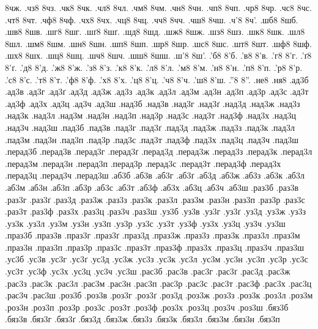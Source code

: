 {8чж.
.чз8
8чз.
.чк8
8чк.
.чл8
8чл.
.чм8
8чм.
.чн8
8чн.
.чп8
8чп.
.чр8
8чр.
.чс8
8чс.
.чт8
8чт.
.чф8
8чф.
.чх8
8чх.
.чц8
8чц.
.чч8
8чч.
.чш8
8чш.
.ч'8
8ч'.
.шб8
8шб.
.шв8
8шв.
.шг8
8шг.
.шґ8
8шґ.
.шд8
8шд.
.шж8
8шж.
.шз8
8шз.
.шк8
8шк.
.шл8
8шл.
.шм8
8шм.
.шн8
8шн.
.шп8
8шп.
.шр8
8шр.
.шс8
8шс.
.шт8
8шт.
.шф8
8шф.
.шх8
8шх.
.шц8
8шц.
.шч8
8шч.
.шш8
8шш.
.ш'8
8ш'.
.'б8
8'б.
.'в8
8'в.
.'г8
8'г.
.'ґ8
8'ґ.
.'д8
8'д.
.'ж8
8'ж.
.'з8
8'з.
.'к8
8'к.
.'л8
8'л.
.'м8
8'м.
.'н8
8'н.
.'п8
8'п.
.'р8
8'р.
.'с8
8'с.
.'т8
8'т.
.'ф8
8'ф.
.'х8
8'х.
.'ц8
8'ц.
.'ч8
8'ч.
.'ш8
8'ш.
.''8
8''.
.не8
.ня8
.ад3б
.ад3в
.ад3г
.ад3ґ
.ад3д
.ад3ж
.ад3з
.ад3к
.ад3л
.ад3м
.ад3н
.ад3п
.ад3р
.ад3с
.ад3т
.ад3ф
.ад3х
.ад3ц
.ад3ч
.ад3ш
.над3б
.над3в
.над3г
.над3ґ
.над3д
.над3ж
.над3з
.над3к
.над3л
.над3м
.над3н
.над3п
.над3р
.над3с
.над3т
.над3ф
.над3х
.над3ц
.над3ч
.над3ш
.пад3б
.пад3в
.пад3г
.пад3ґ
.пад3д
.пад3ж
.пад3з
.пад3к
.пад3л
.пад3м
.пад3н
.пад3п
.пад3р
.пад3с
.пад3т
.пад3ф
.пад3х
.пад3ц
.пад3ч
.пад3ш
.перад3б
.перад3в
.перад3г
.перад3ґ
.перад3д
.перад3ж
.перад3з
.перад3к
.перад3л
.перад3м
.перад3н
.перад3п
.перад3р
.перад3с
.перад3т
.перад3ф
.перад3х
.перад3ц
.перад3ч
.перад3ш
.аб3б
.аб3в
.аб3г
.аб3ґ
.аб3д
.аб3ж
.аб3з
.аб3к
.аб3л
.аб3м
.аб3н
.аб3п
.аб3р
.аб3с
.аб3т
.аб3ф
.аб3х
.аб3ц
.аб3ч
.аб3ш
.раз3б
.раз3в
.раз3г
.раз3ґ
.раз3д
.раз3ж
.раз3з
.раз3к
.раз3л
.раз3м
.раз3н
.раз3п
.раз3р
.раз3с
.раз3т
.раз3ф
.раз3х
.раз3ц
.раз3ч
.раз3ш
.уз3б
.уз3в
.уз3г
.уз3ґ
.уз3д
.уз3ж
.уз3з
.уз3к
.уз3л
.уз3м
.уз3н
.уз3п
.уз3р
.уз3с
.уз3т
.уз3ф
.уз3х
.уз3ц
.уз3ч
.уз3ш
.праз3б
.праз3в
.праз3г
.праз3ґ
.праз3д
.праз3ж
.праз3з
.праз3к
.праз3л
.праз3м
.праз3н
.праз3п
.праз3р
.праз3с
.праз3т
.праз3ф
.праз3х
.праз3ц
.праз3ч
.праз3ш
.ус3б
.ус3в
.ус3г
.ус3ґ
.ус3д
.ус3ж
.ус3з
.ус3к
.ус3л
.ус3м
.ус3н
.ус3п
.ус3р
.ус3с
.ус3т
.ус3ф
.ус3х
.ус3ц
.ус3ч
.ус3ш
.рас3б
.рас3в
.рас3г
.рас3ґ
.рас3д
.рас3ж
.рас3з
.рас3к
.рас3л
.рас3м
.рас3н
.рас3п
.рас3р
.рас3с
.рас3т
.рас3ф
.рас3х
.рас3ц
.рас3ч
.рас3ш
.роз3б
.роз3в
.роз3г
.роз3ґ
.роз3д
.роз3ж
.роз3з
.роз3к
.роз3л
.роз3м
.роз3н
.роз3п
.роз3р
.роз3с
.роз3т
.роз3ф
.роз3х
.роз3ц
.роз3ч
.роз3ш
.бяз3б
.бяз3в
.бяз3г
.бяз3ґ
.бяз3д
.бяз3ж
.бяз3з
.бяз3к
.бяз3л
.бяз3м
.бяз3н
.бяз3п
}
